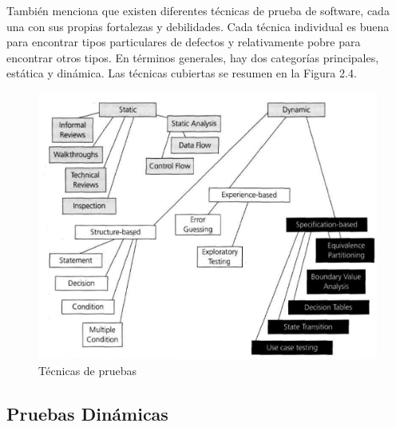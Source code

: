 También menciona que existen diferentes técnicas de prueba de software, cada una con sus propias fortalezas y debilidades. Cada técnica individual es buena para encontrar tipos particulares de defectos y relativamente pobre para encontrar otros tipos.
En términos generales, hay dos categorías principales, estática y dinámica. Las técnicas cubiertas se resumen en la Figura 2.4.
 
\begin{figure}[H]
	\begin{center}
		\includegraphics[width=.70\textwidth]{images/marcoteorico/tecnicas}
		\caption{Técnicas de pruebas}
		\label{fig:tecnicas}
	\end{center}
\end{figure}

\subsection{Pruebas Dinámicas}

